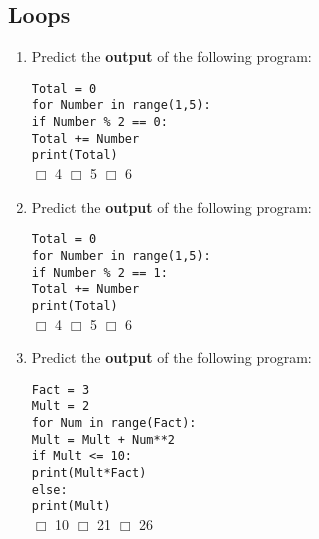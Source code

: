 \documentclass[11pt]{report}
\begin{document}
\subsection*{Loops}
\begin{enumerate}


    \item Predict the \textbf{output} of the following program:

    {\tt Total = 0}\\
    {\tt for Number in range(1,5):}\\
    \indent \hspace{2em} {\tt  if Number \% 2 == 0:}\\
    \indent \hspace{4em} {\tt  Total += Number}\\
    {\tt  print(Total)}\\
    $\Box$ 4 \hspace{3em} $\Box$ 5 \hspace{3em} $\Box$ 6

    \item Predict the \textbf{output} of the following program:

    {\tt Total = 0}\\
    {\tt for Number in range(1,5):}\\
    \indent \hspace{2em} {\tt  if Number \% 2 == 1:}\\
    \indent \hspace{4em} {\tt  Total += Number}\\
    {\tt  print(Total)}\\
    $\Box$ 4 \hspace{3em} $\Box$ 5 \hspace{3em} $\Box$ 6

    \item Predict the \textbf{output} of the following program:

    {\tt Fact = 3}\\
    {\tt Mult = 2}\\
    {\tt for Num in range(Fact):}\\
    \indent \hspace{2em} {\tt  Mult = Mult + Num**2}\\

    {\tt if Mult <= 10:}\\
    \indent \hspace{2em} {\tt  print(Mult*Fact)}\\
    {\tt else:}\\
    \indent \hspace{2em} {\tt  print(Mult)}\\
    $\Box$ 10 \hspace{3em} $\Box$ 21 \hspace{3em} $\Box$ 26


\end{enumerate}
\end{document}
